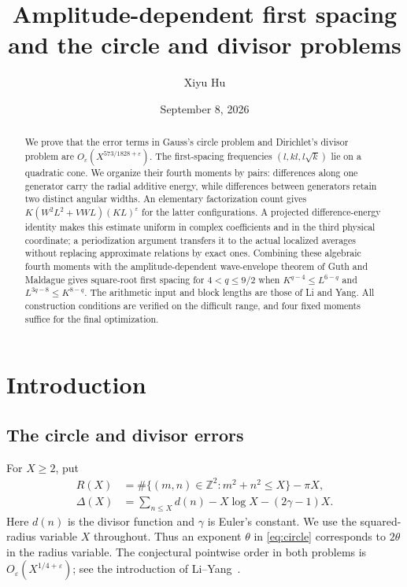\documentclass[11pt,reqno]{amsart}
\title[First spacing and lattice-point discrepancy]{Amplitude-dependent first spacing\texorpdfstring{\\}{ }and the circle and divisor problems}
\author{Xiyu Hu}
\date{September 8, 2026}
\numberwithin{equation}{section}
\theoremstyle{definition}
\theoremstyle{remark}
\newcommand{\Z}{\mathbb Z}
\newcommand{\eps}{\varepsilon}
\begin{document}
\begin{abstract}
We prove that the error terms in Gauss's circle problem and Dirichlet's divisor problem are
$O_\eps(X^{573/1828+\eps})$.
The first-spacing frequencies $(l,kl,l\sqrt{k})$ lie on a quadratic cone.
We organize their fourth moments by pairs: differences along one generator carry the radial
additive energy, while differences between generators retain two distinct angular widths.
An elementary factorization count gives
$K(W^2L^2+VWL)(KL)^\eps$ for the latter configurations.
A projected difference-energy identity makes this estimate uniform in complex coefficients
and in the third physical coordinate; a periodization argument transfers it to the actual
localized averages without replacing approximate relations by exact ones.
Combining these algebraic fourth moments with the amplitude-dependent wave-envelope theorem
of Guth and Maldague gives square-root first spacing for $4<q\le9/2$ when
$K^{q-4}\le L^{6-q}$ and $L^{3q-8}\le K^{8-q}$.
The arithmetic input and block lengths are those of Li and Yang.
All construction conditions are verified on the difficult range, and four fixed moments suffice
for the final optimization.
\end{abstract}
\maketitle
\setcounter{tocdepth}{1}
\tableofcontents

\section{Introduction}\label{sec:intro}
\subsection{The circle and divisor errors}
For $X\ge2$, put
\begin{align}
 R(X)&=\#\{(m,n)\in\Z^2:m^2+n^2\le X\}-\pi X,\label{eq:circle}\\
 \Delta(X)&=\sum_{n\le X}d(n)-X\log X-(2\gamma-1)X.\label{eq:divisor}
\end{align}
Here $d(n)$ is the divisor function and $\gamma$ is Euler's constant.
We use the squared-radius variable $X$ throughout. Thus an exponent $\theta$ in \eqref{eq:circle} corresponds to $2\theta$ in the radius variable.
The conjectural pointwise order in both problems is $O_\eps(X^{1/4+\eps})$; see the introduction of Li--Yang~\cite{LY}.
\end{document}
